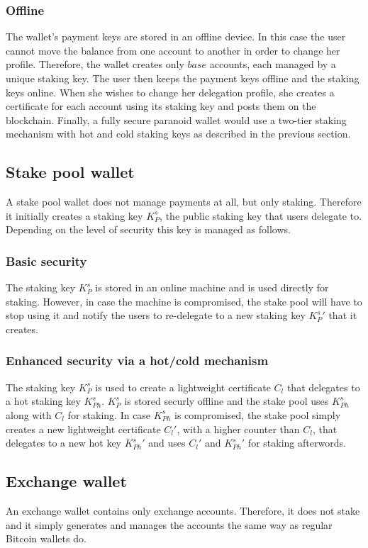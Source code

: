 \subsubsection{Offline}

The wallet's payment keys are stored in an offline device. In this case the user cannot move the balance from one account to another in order to change her profile. Therefore, the wallet creates only $base$ accounts, each managed by a unique staking key. The user then keeps the payment keys offline and the staking keys online. When she wishes to change her delegation profile, she creates a certificate for each account using its staking key and posts them on the blockchain. Finally, a fully secure paranoid wallet would use a two-tier staking mechanism with hot and cold staking keys as described in the previous section.

\subsection{Stake pool wallet}

A stake pool wallet does not manage payments at all, but only staking. Therefore it initially creates a staking key $K^s_P$, the public staking key that users delegate to. Depending on the level of security this key is managed as follows.

\subsubsection{Basic security}

The staking key $K^s_P$ is stored in an online machine and is used directly for staking. However, in case the machine is compromised, the stake pool will have to stop using it and notify the users to re-delegate to a new staking key ${K^s_P}'$ that it creates.

\subsubsection{Enhanced security via a hot/cold mechanism}

The staking key $K^s_P$ is used to create a lightweight certificate $C_l$ that delegates to a hot staking key $K^s_{Ph}$. $K^s_P$ is stored securly offline and the stake pool uses $K^s_{Ph}$ along with $C_l$ for staking. In case $K^s_{Ph}$ is compromised, the stake pool simply creates a new lightweight certificate ${C_l}'$, with a higher counter than $C_l$, that delegates to a new hot key ${K^s_{Ph}}'$ and uses ${C_l}'$ and ${K^s_{Ph}}'$ for staking afterwords.

\subsection{Exchange wallet}

An exchange wallet contains only exchange accounts. Therefore, it does not stake and it simply generates and manages the accounts the same way as regular Bitcoin wallets do.